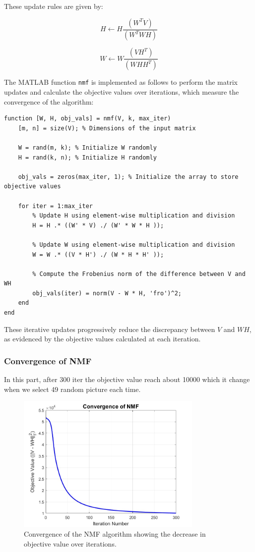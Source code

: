 \documentclass[journal,12pt,onecolumn,draftclsnofoot]{IEEEtran}
\begin{document}
These update rules are given by:

\[
H \leftarrow H \frac{(W^TV)}{(W^TWH) }
\]

\[
W \leftarrow W \frac{(VH^T)}{(WHH^T) }
\]


The MATLAB function \texttt{nmf} is implemented as follows to perform the matrix updates and calculate the objective values over iterations, which measure the convergence of the algorithm:

\begin{lstlisting}
function [W, H, obj_vals] = nmf(V, k, max_iter)
    [m, n] = size(V); % Dimensions of the input matrix
    
    W = rand(m, k); % Initialize W randomly
    H = rand(k, n); % Initialize H randomly
    
    obj_vals = zeros(max_iter, 1); % Initialize the array to store objective values
    
    for iter = 1:max_iter
        % Update H using element-wise multiplication and division
        H = H .* ((W' * V) ./ (W' * W * H ));
        
        % Update W using element-wise multiplication and division
        W = W .* ((V * H') ./ (W * H * H' ));
        
        % Compute the Frobenius norm of the difference between V and WH
        obj_vals(iter) = norm(V - W * H, 'fro')^2;
    end
end
\end{lstlisting}

These iterative updates progressively reduce the discrepancy between $V$ and $WH$, as evidenced by the objective values calculated at each iteration.



\subsubsection*{Convergence of NMF}
In this part, after 300 iter the  objective value reach about 10000 which it change when we select 49 random picture each time.
\begin{figure}[htbp]
    \centering
    \includegraphics[width=0.8\textwidth]{images/NMF_Convergence.jpeg}
    \caption{Convergence of the NMF algorithm showing the decrease in objective value over iterations.}
    \label{fig:nmf_convergence}
\end{figure}
\end{document}
